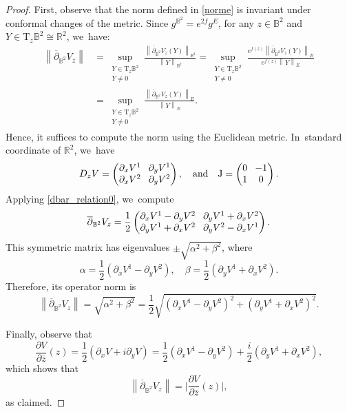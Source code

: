 \documentclass[JEP,XML,SOM,Unicode,NoEqCountersInSection, NoFloatCountersInSection,published]{cedram}
\theoremstyle{plain}
\theoremstyle{definition}
\begin{document}
\begin{proof}
First, observe that the norm defined in \eqref{norme} is invariant under conformal changes of the metric. Since \(g^{\mathbb{B}^2} = e^{2f} g^E \), for any \(z \in \mathbb{B}^2 \) and \(Y \in \mathrm{T}_z \mathbb{B}^2 \cong \mathbb{R}^2 \), we~have:
\begin{align*}
\left\lVert \overline{\partial}_{\mathbb{B}^2}V_z \right\rVert
&= \sup_{\substack{Y \in \mathrm{T}_z \mathbb{B}^2 \\ Y \neq 0}} \frac{\left\lVert \overline{\partial}_{\mathbb{B}^2}V_z(Y) \right\rVert_{\mathbb{B}^2}}{\left\lVert Y \right\rVert_{\mathbb{B}^2}} = \sup_{\substack{Y \in \mathrm{T}_z \mathbb{B}^2 \\ Y \neq 0}} \frac{e^{f(z)} \left\lVert \overline{\partial}_{\mathbb{B}^2}V_z(Y) \right\rVert_E}{e^{f(z)} \left\lVert Y \right\rVert_E} \\
&= \sup_{\substack{Y \in \mathrm{T}_z \mathbb{B}^2 \\ Y \neq 0}} \frac{ \left\lVert\overline{\partial}_{\mathbb{B}^2}V_z(Y) \right\rVert_E}{\left \lVert Y \right\rVert_E}.
\end{align*}
Hence, it suffices to compute the norm using the Euclidean metric. In~standard coordinate of $\mathbb{R}^2$, we~have
\[\arraycolsep4pt
D_z V =
\begin{pmatrix}
\partial_x V^1 & \partial_y V^1 \\
\partial_x V^2 & \partial_y V^2
\end{pmatrix},
\quad
\text{and} \quad
\mathrm{J} =
\begin{pmatrix}
0 & -1 \\
1 & 0
\end{pmatrix}.
\]
Applying \eqref{dbar_relation0}, we~compute
\[\arraycolsep4pt
\overline{\partial}_{\mathbb{B}^2}V_z
=
\frac{1}{2}
\begin{pmatrix}
\partial_x V^1 - \partial_y V^2 & \partial_y V^1 + \partial_x V^2 \\
\partial_y V^1 + \partial_x V^2 & \partial_y V^2 - \partial_x V^1
\end{pmatrix}.
\]
This symmetric matrix has eigenvalues \(\pm \sqrt{\alpha^2 + \beta^2} \), where
\[
\alpha = \frac{1}{2}(\partial_x V^1 - \partial_y V^2), \quad
\beta = \frac{1}{2}(\partial_y V^1 + \partial_x V^2).
\]
Therefore, its operator norm is
\[
\left\lVert \overline{\partial}_{\mathbb{B}^2}V_z \right\rVert
= \sqrt{\alpha^2 + \beta^2}
= \frac{1}{2} \sqrt{(\partial_x V^1 - \partial_y V^2)^2 + (\partial_y V^1 + \partial_x V^2)^2}.
\]

Finally, observe that
\[
\frac{\partial V}{\partial \overline{z}}(z)
= \frac{1}{2} \left(\partial_x V + i \partial_y V \right)
= \frac{1}{2} \left(\partial_x V^1 - \partial_y V^2 \right) + \frac{i}{2}(\partial_y V^1 + \partial_x V^2),
\]
which shows that
\[
\left\lVert \overline{\partial}_{\mathbb{B}^2} V_z \right\rVert = \biggl| \frac{\partial V}{\partial \overline{z}}(z) \biggr|,
\]
as claimed.
\end{proof}
\end{document}
